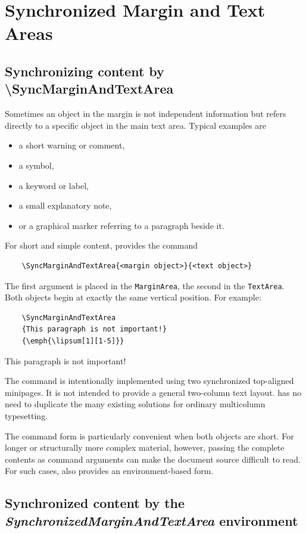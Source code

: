 \documentclass[
11pt,
a4paper,
oneside
]{scrbook}
\begin{document}
\section{Synchronized Margin and Text Areas}
\subsection{Synchronizing content by \textbackslash SyncMarginAndTextArea}

Sometimes an object in the margin is not independent information but
refers directly to a specific object in the main text area.
Typical examples are
\begin{itemize}
	\item a short warning or comment,
	\item a symbol,
	\item a keyword or label,
	\item a small explanatory note,
	\item or a graphical marker referring to a paragraph beside it.
\end{itemize}
For short and simple content, \mdlayout{} provides the command
\begin{verbatim}
	\SyncMarginAndTextArea{<margin object>}{<text object>}
\end{verbatim}
The first argument is placed in the \texttt{MarginArea}, the second
in the \texttt{TextArea}. Both objects begin at exactly the same
vertical position.
For example:
\begin{verbatim}
	\SyncMarginAndTextArea
	{This paragraph is not important!}
	{\emph{\lipsum[1][1-5]}}
\end{verbatim}
\SyncMarginAndTextArea
{This paragraph is not important!}
{\emph{\lipsum[1][1-5]}}

\vspace{2ex}

\noindent
The command is intentionally implemented using two synchronized
top-aligned minipages. It is not intended to provide a general
two-column text layout. \mdlayout{} has no need to duplicate the many
existing solutions for ordinary multicolumn typesetting.

The command form is particularly convenient when both objects are
short. For longer or structurally more complex material, however,
passing the complete contents as command arguments can make the
document source difficult to read. For such cases, \mdlayout{} also
provides an environment-based form.

\subsection{Synchronized content by the \emph{SynchronizedMarginAndTextArea} environment}
\end{document}
